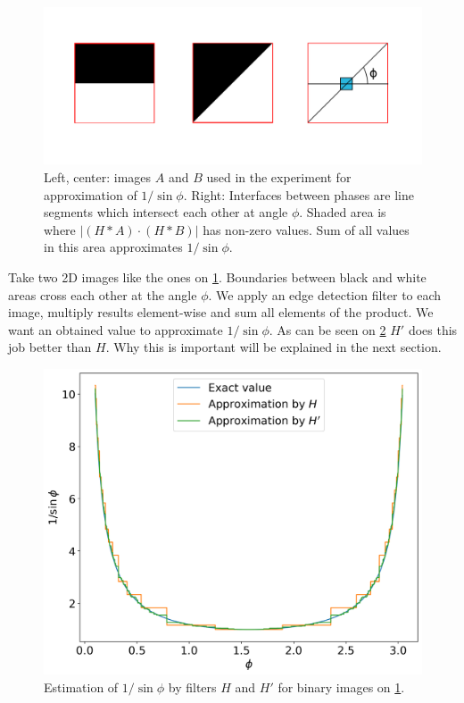 \documentclass[reprint,amsmath,amssymb,aps,pre,showkeys,showpacs]{revtex4-1}
\begin{document}
\begin{figure}
  \centering
  \includegraphics[width=0.8\linewidth]{images/experiment-setup.png}
  \caption[]{Left, center: images $A$ and $B$ used in the experiment for
    approximation of $1 / \sin \phi$. Right: Interfaces between phases are
    line segments which intersect each other at angle $\phi$. Shaded area is
    where $|(H*A)\cdot(H*B)|$ has non-zero values. Sum of all values in this
    area approximates $1 / \sin \phi$.}
  \label{fig:experiment-setup}
\end{figure}
Take two 2D images like the ones on \cref{fig:experiment-setup}. Boundaries
between black and white areas cross each other at the angle $\phi$. We apply an
edge detection filter to each image, multiply results element-wise and sum all
elements of the product. We want an obtained value to approximate
$1/\sin \phi$. As can be seen on \cref{fig:filter-comparison} $H'$ does this job
better than $H$. Why this is important will be explained in the next section.
\begin{figure}
  \centering
  \includegraphics[width=0.8\linewidth]{images/filter-comparison.png}
  \caption[]{Estimation of $1/\sin\phi$ by filters $H$ and $H'$ for binary images on \cref{fig:experiment-setup}.}
  \label{fig:filter-comparison}
\end{figure}
\end{document}

